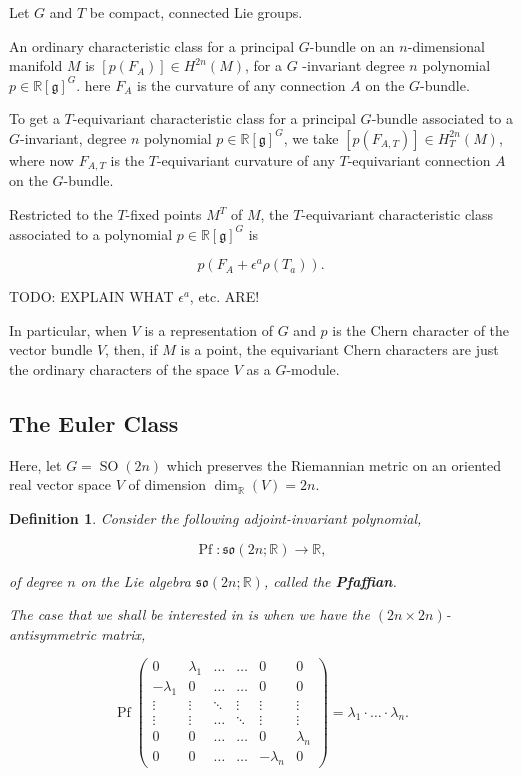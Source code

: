 \documentclass{article}
\newtheorem{defn}[theorem]{Definition\rm}
\newcommand{\lra}{\longrightarrow}
\newcommand{\e}{\epsilon}
\newcommand{\RR}{\mathbb{R}}
\newcommand{\mfg}{\mathfrak{g}}
\newcommand{\mf}[1]{\mathfrak{#1}}
\DeclareMathOperator{\Pf}{Pf}
\DeclareMathOperator{\SO}{SO}
\begin{document}
Let $G$ and $T$ be compact, connected Lie groups.

An ordinary characteristic class for a principal $G$-bundle on an $n$-dimensional manifold $M$ is $[p(F_{A})] \in H^{2n}(M)$, for a $G$ -invariant degree $n$ polynomial $p \in \RR[\mfg]^{G}$. here $F_{A}$ is the curvature of any connection $A$ on the $G$-bundle.

To get a $T$-equivariant characteristic class for a principal $G$-bundle associated to a $G$-invariant, degree $n$ polynomial $p \in \RR[\mfg]^{G}$, we take $[p(F_{A, T})] \in H_{T}^{2n}(M)$, where now $F_{A,T}$ is the $T$-equivariant curvature of any $T$-equivariant connection $A$ on the $G$-bundle.

Restricted to the $T$-fixed points $M^{T}$ of $M$, the $T$-equivariant characteristic class associated to a polynomial $p \in \RR[\mfg]^{G}$ is

\begin{equation*}
	p(F_{A} + \e^{a}\rho(T_{a})).
\end{equation*}

TODO: EXPLAIN WHAT $\e^{a}$, etc. ARE!

In particular, when $V$ is a representation of $G$ and $p$ is the Chern character of the vector bundle $V$, then, if $M$ is a point, the equivariant Chern characters are just the ordinary characters of the space $V$ as a $G$-module.

\subsection{The Euler Class}

Here, let $G = \SO(2n)$ which preserves the Riemannian metric on an oriented real vector space $V$ of dimension $\dim_{\RR}(V) = 2n$.

\begin{defn}
	Consider the following adjoint-invariant polynomial,
	
	\begin{equation*}
		\Pf : \mf{so}(2n;\RR) \lra \RR,
	\end{equation*}

	of degree $n$ on the Lie algebra $\mf{so}(2n;\RR)$, called the \textbf{Pfaffian}.
	
	The case that we shall be interested in is when we have the $(2n \times 2n)$-antisymmetric matrix,
	
	\begin{equation*}
		\Pf
		\begin{pmatrix}
			0 & \lambda_{1} & \dots & \dots & 0 & 0 \\
			-\lambda_{1} & 0 & \dots & \dots & 0 & 0 \\
			\vdots & \vdots & \ddots & \vdots & \vdots & \vdots \\
			\vdots & \vdots & \dots & \ddots & \vdots & \vdots \\
			0 & 0 & \dots & \dots & 0 & \lambda_{n} \\
			0 & 0 & \dots & \dots & -\lambda_{n} & 0			
		\end{pmatrix}
		= \lambda_{1}\cdot\ldots \cdot \lambda_{n}.
	\end{equation*}
	
\end{defn}
\end{document}
